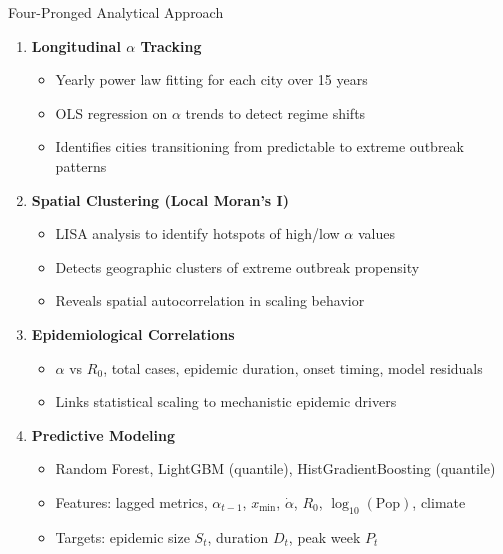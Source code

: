 \documentclass[10pt,aspectratio=169]{beamer}
\begin{document}
\begin{frame}{Four-Pronged Analytical Approach}
\begin{enumerate}
    \item \textbf{Longitudinal $\alpha$ Tracking}
    \begin{itemize}
        \item Yearly power law fitting for each city over 15 years
        \item OLS regression on $\alpha$ trends to detect regime shifts
        \item Identifies cities transitioning from predictable to extreme outbreak patterns
    \end{itemize}

    \vspace{0.15cm}
    \item \textbf{Spatial Clustering (Local Moran's I)}
    \begin{itemize}
        \item LISA analysis to identify hotspots of high/low $\alpha$ values
        \item Detects geographic clusters of extreme outbreak propensity
        \item Reveals spatial autocorrelation in scaling behavior
    \end{itemize}

    \vspace{0.15cm}
    \item \textbf{Epidemiological Correlations}
    \begin{itemize}
        \item $\alpha$ vs $R_0$, total cases, epidemic duration, onset timing, model residuals
        \item Links statistical scaling to mechanistic epidemic drivers
    \end{itemize}

    \vspace{0.15cm}
    \item \textbf{Predictive Modeling}
    \begin{itemize}
        \item Random Forest, LightGBM (quantile), HistGradientBoosting (quantile)
        \item Features: lagged metrics, $\alpha_{t-1}$, $x_{\min}$, $\dot{\alpha}$, $R_0$, $\log_{10}(\text{Pop})$, climate
        \item Targets: epidemic size $S_t$, duration $D_t$, peak week $P_t$
    \end{itemize}
\end{enumerate}
\end{frame}
\end{document}
